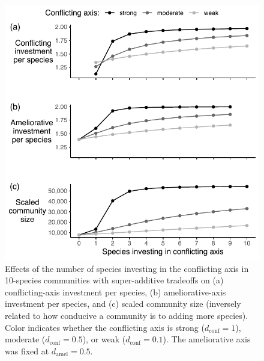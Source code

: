 \documentclass[12pt]{article}
\begin{document}
\begin{figure}[ht!]
\centering
\includegraphics{4-stab.pdf}
\caption{Effects of the number of species investing in the conflicting axis
in 10-species communities with super-additive tradeoffs on 
(a) conflicting-axis investment per species,
(b) ameliorative-axis investment per species, and 
(c) scaled community size (inversely related to how conducive a community 
is to adding more species).
Color indicates whether the conflicting axis is strong ($d_{\text{conf}} = 1$),
moderate ($d_{\text{conf}} = 0.5$), or weak ($d_{\text{conf}} = 0.1$).
The ameliorative axis was fixed at $d_{\text{amel}} = 0.5$.
}
\label{fig:stabilizers}
\end{figure}
\end{document}

